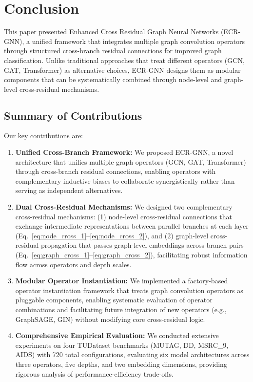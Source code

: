 \section{Conclusion}
\label{sec:conclusion}

This paper presented Enhanced Cross Residual Graph Neural Networks (ECR-GNN), a unified framework that integrates multiple graph convolution operators through structured cross-branch residual connections for improved graph classification. Unlike traditional approaches that treat different operators (GCN, GAT, Transformer) as alternative choices, ECR-GNN designs them as modular components that can be systematically combined through node-level and graph-level cross-residual mechanisms.

\subsection{Summary of Contributions}

Our key contributions are:

\begin{enumerate}
    \item \textbf{Unified Cross-Branch Framework:} We proposed ECR-GNN, a novel architecture that unifies multiple graph operators (GCN, GAT, Transformer) through cross-branch residual connections, enabling operators with complementary inductive biases to collaborate synergistically rather than serving as independent alternatives.

    \item \textbf{Dual Cross-Residual Mechanisms:} We designed two complementary cross-residual mechanisms: (1) node-level cross-residual connections that exchange intermediate representations between parallel branches at each layer (Eq.~\ref{eq:node_cross_1}--\ref{eq:node_cross_2}), and (2) graph-level cross-residual propagation that passes graph-level embeddings across branch pairs (Eq.~\ref{eq:graph_cross_1}--\ref{eq:graph_cross_2}), facilitating robust information flow across operators and depth scales.

    \item \textbf{Modular Operator Instantiation:} We implemented a factory-based operator instantiation framework that treats graph convolution operators as pluggable components, enabling systematic evaluation of operator combinations and facilitating future integration of new operators (e.g., GraphSAGE, GIN) without modifying core cross-residual logic.

    \item \textbf{Comprehensive Empirical Evaluation:} We conducted extensive experiments on four TUDataset benchmarks (MUTAG, DD, MSRC\_9, AIDS) with 720 total configurations, evaluating six model architectures across three operators, five depths, and two embedding dimensions, providing rigorous analysis of performance-efficiency trade-offs.
\end{enumerate}

